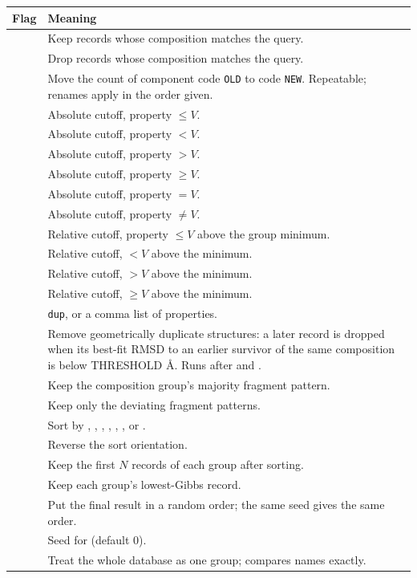 \begin{longtable}{@{}L{4.3cm}L{9.2cm}@{}}
\toprule
\textbf{Flag} & \textbf{Meaning} \\
\midrule
\endhead
{} & Keep records whose composition matches the query. \\
 & Drop records whose composition matches the query. \\
 & Move the count of component code \texttt{OLD} to
code \texttt{NEW}. Repeatable; renames apply in the order given. \\
 & Absolute cutoff, property $\le V$. \\
 & Absolute cutoff, property $< V$. \\
 & Absolute cutoff, property $> V$. \\
 & Absolute cutoff, property $\ge V$. \\
 & Absolute cutoff, property $= V$. \\
 & Absolute cutoff, property $\ne V$. \\
 & Relative cutoff, property $\le V$ above the group
minimum. \\
 & Relative cutoff, $<V$ above the minimum. \\
 & Relative cutoff, $>V$ above the minimum. \\
 & Relative cutoff, $\ge V$ above the
minimum. \\
 & \texttt{dup}, or a comma list of
 properties. \\
 & Remove geometrically duplicate structures: a
later record is dropped when its best-fit RMSD to an earlier survivor of the
same composition is below THRESHOLD \AA{}. Runs after  and
. \\
 & Keep the composition group's majority fragment pattern. \\
 & Keep only the deviating fragment patterns. \\
 & Sort by , , , ,
, , or . \\
 & Reverse the sort orientation. \\
 & Keep the first $N$ records of each group after sorting. \\
 & Keep each group's lowest-Gibbs record. \\
 & Put the final result in a random order; the same seed gives
the same order. \\
 & Seed for  (default 0). \\
 & Treat the whole database as one group; 
compares names exactly. \\
\bottomrule
\end{longtable}

